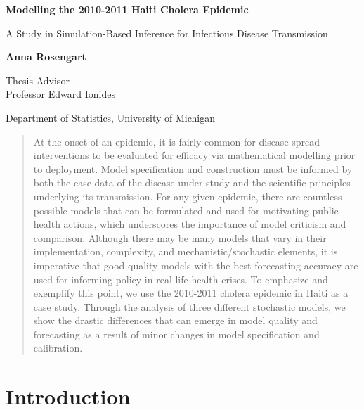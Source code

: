 \documentclass[12pt]{article}
\date{This manuscript was compiled on \today}
\begin{document}
\def\spacingset#1{\renewcommand{\baselinestretch}%
{#1}\small\normalsize} \spacingset{1}

\thispagestyle{plain}
\begin{center}
    \Large
    \textbf{Modelling the 2010-2011 Haiti Cholera Epidemic}
        
    \vspace{0.1cm}
    \large
    A Study in Simulation-Based Inference for Infectious Disease Transmission
        
    \vspace{0.4cm}
    \textbf{Anna Rosengart}
    
    \vspace{0.4cm}
    Thesis Advisor\\
    Professor Edward Ionides
    
    \vspace{0.2cm}
    Department of Statistics, University of Michigan
       
    \vspace{0.9cm}
\end{center}

\begin{abstract}
At the onset of an epidemic, it is fairly common for disease spread interventions to be evaluated for efficacy via mathematical modelling prior to deployment. Model specification and construction must be informed by both the case data of the disease under study and the scientific principles underlying its transmission. For any given epidemic, there are countless possible models that can be formulated and used for motivating public health actions, which underscores the importance of model criticism and comparison. Although there may be many models that vary in their implementation, complexity, and mechanistic/stochastic elements, it is imperative that good quality models with the best forecasting accuracy are used for informing policy in real-life health crises. To emphasize and exemplify this point, we use the 2010-2011 cholera epidemic in Haiti as a case study. Through the analysis of three different stochastic models, we show the drastic differences that can emerge in model quality and forecasting as a result of minor changes in model specification and calibration. 
\end{abstract}

\newpage

\spacingset{1.25} %

\section{Introduction}
\end{document}
